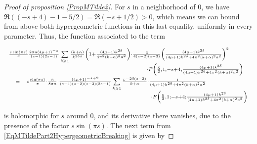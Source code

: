 \documentclass{jams-l}
\theoremstyle{definition}
\theoremstyle{remark}
\numberwithin{equation}{section}
\begin{document}
\begin{proof}[Proof of proposition \ref{PropMTilde2}]
                        \noindent For $s$ in a neighborhood of $0$, we have $\Re \left( \left( -s+4 \right) - 1 - 5/2 \right) = \Re \left( -s + 1/2 \right) > 0$, which means we can bound from above both hypergeometric functions in this last equality, uniformly in every parameter. Thus, the function associated to the term
                        
                        \[ \begin{array}{lll}
                                \multicolumn{3}{l}{\scriptstyle \frac{s \sin \left( \pi s \right)}{\pi} \frac{2 \pi a \left( 4 \mu + 1 \right)^{-s}}{\left( s-1 \right) \left( 2s-1 \right)} \sum\limits_{k \geqslant 1} \frac{\left( k + \alpha \right)}{k^{2 \delta s}} \left( 1 + \frac{\left( 4 \mu + 1 \right) k^{2 \delta}}{4 \pi^2 \left( k + \alpha \right)^2 a^2} \right) \cdot \frac{3}{4 \left( s-2 \right) \left( s-3 \right)} \left( \frac{\left( 4 \mu + 1 \right) k^{2 \delta}}{\left( 4 \mu + 1 \right) k^{2 \delta} + 4 \pi^2 \left( k + \alpha \right)^2 a^2} \right)^2} \\[0.5em]
                                
                                \multicolumn{3}{l}{\scriptstyle \qquad \qquad \qquad \qquad \qquad \qquad \qquad \qquad \qquad \qquad \cdot F \left( \frac{5}{2}, 1; -s+4; \frac{\left( 4 \mu + 1 \right) k^{2 \delta}}{\left( 4 \mu + 1 \right) k^{2 \delta} + 4 \pi^2 \left( k + \alpha \right)^2 a^2} \right)} \\[0.5em]
                                
                                & \scriptstyle = & \scriptstyle s \frac{\sin \left( \pi s \right)}{\pi} \cdot \frac{3}{8 \pi a} \cdot \frac{\left( 4 \mu + 1 \right)^{-s+2}}{\left( s-1 \right) \left( s-2 \right) \left( s-3 \right) \left( 2s-1 \right)} \sum\limits_{k \geqslant 1} \frac{k^{-2\delta \left( s-2 \right)}}{k + \alpha} \cdot \frac{1}{\left( 4 \mu + 1 \right) k^{2 \delta} + 4 \pi^2 \left( k + \alpha \right)^2 a^2} \\[0.5em]
                                
                                && \scriptstyle \qquad \qquad \qquad \qquad \qquad \qquad \qquad \qquad \qquad \cdot F \left( \frac{5}{2}, 1; -s+4; \frac{\left( 4 \mu + 1 \right) k^{2 \delta}}{\left( 4 \mu + 1 \right) k^{2 \delta} + 4 \pi^2 \left( k + \alpha \right)^2 a^2} \right)
                            \end{array} \]
                        
                        \noindent is holomorphic for $s$ around $0$, and its derivative there vanishes, due to the presence of the factor $s \sin \left( \pi s \right)$. The next term from \eqref{EqMTildePart2HypergeometricBreaking} is given by
                        

\end{proof}
\end{document}
